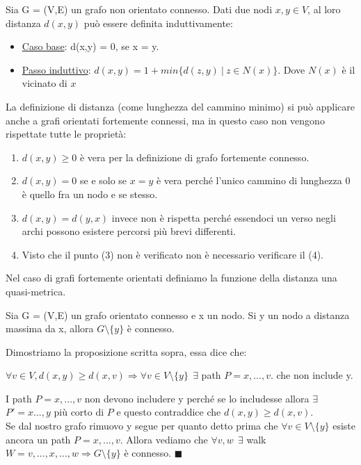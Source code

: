 \begin{definition}
    Sia G = (V,E) un grafo non orientato connesso. Dati due nodi $x,y \in V$, al loro distanza $d(x,y)$ può essere definita induttivamente:
    \begin{itemize}
        \item \underline{Caso base}: d(x,y) = 0, se x = y.
        \item \underline{Passo induttivo}: $d(x,y) = 1 + min\{d(z,y) \: | \: z\in N(x)\}$. Dove $N(x)$ è il vicinato di $x$
    \end{itemize}
\end{definition}

La definizione di distanza (come lunghezza del cammino minimo) si può applicare anche a grafi orientati fortemente connessi, ma in questo caso non vengono rispettate tutte le proprietà:
\begin{enumerate}
    \item $d(x,y) \geq 0$ è vera per la definizione di grafo fortemente connesso.
    \item $d(x,y) = 0$ se e solo se $x = y$ è vera perché l'unico cammino di lunghezza 0 è quello fra un nodo e se stesso.
    \item $d(x,y) = d(y,x)$ invece non è rispetta perché essendoci un verso negli archi possono esistere percorsi più brevi differenti.
    \item Visto che il punto (3) non è verificato non è necessario verificare il (4).
\end{enumerate}
Nel caso di grafi fortemente orientati definiamo la funzione della distanza una quasi-metrica.

\begin{proposition}\label{proposizione-distanza-1}
    Sia G = (V,E) un grafo orientato connesso e x un nodo. Si y un nodo a distanza massima da x, allora $G\setminus \{y\}$ è connesso.
\end{proposition}

\begin{demostration}
    Dimostriamo la proposizione scritta sopra, essa dice che:
    \begin{center}
        $\forall v \in V, d(x,y) \geq d(x,v) \Longrightarrow \forall v \in V \setminus \{y\} \:\: \exists$ path $P = x,...,v$. che non include y.
    \end{center}
    I path $P = x,...,v$ non devono includere y perché se lo includesse allora $\exists$ $P' = x...,y$ più corto di $P$ e questo contraddice che $d(x,y) \geq d(x,v)$.\\
    Se dal nostro grafo rimuovo y segue per quanto detto prima che $\forall v \in V \setminus \{y\}$ esiste ancora un path $P = x,...,v$.
    Allora vediamo che $\forall v,w \:\: \exists$ walk $W = v,...,x,...,w \Longrightarrow G \setminus \{y\}$ è connesso. $\blacksquare$
\end{demostration}

